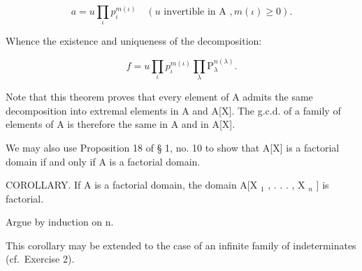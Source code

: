 \[
a = u \prod_ {\iota} p _ {\iota} ^ {m (\iota)} \quad (u \text {   invertible   in   A }, m (\iota) \geqslant 0).
\]

Whence the existence and uniqueness of the decomposition:

\[
f = u \prod_ {\iota} p _ {\iota} ^ {m (\iota)} \prod_ {\lambda} \mathrm{P} _ {\lambda} ^ {n (\lambda)}.
\]

Note that this theorem proves that every element of A admits the same decomposition into extremal elements in A and A{[}X{]}. The g.c.d. of a family of elements of A is therefore the same in A and in A{[}X{]}.

We may also use Proposition 18 of § 1, no. 10 to show that A{[}X{]} is a factorial domain if and only if A is a factorial domain.

COROLLARY. If A is a factorial domain, the domain A{[}X \(_{1}\) , . . . , X \(_{n}\) {]} is factorial.

Argue by induction on n.

This corollary may be extended to the case of an infinite family of indeterminates (cf.~Exercise 2).

